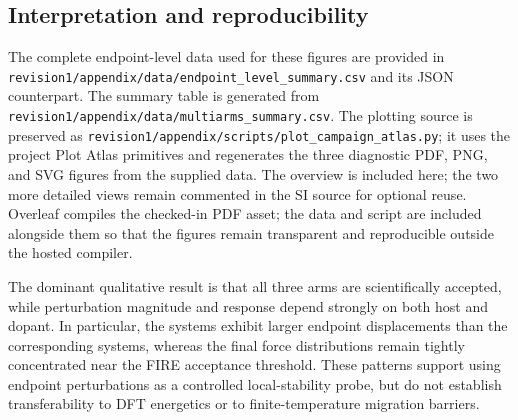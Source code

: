 %
%
\subsection{Interpretation and reproducibility}

The complete endpoint-level data used for these figures are provided in
\texttt{revision1/appendix/data/endpoint\_level\_summary.csv} and its JSON
counterpart.  The summary table is generated from
\texttt{revision1/appendix/data/multiarms\_summary.csv}.  The plotting source
is preserved as
\texttt{revision1/appendix/scripts/plot\_campaign\_atlas.py}; it uses the
project Plot Atlas primitives and regenerates the three diagnostic PDF, PNG,
and SVG figures from the supplied data.  The overview is included here; the
two more detailed views remain commented in the SI source for optional reuse.
Overleaf compiles the checked-in PDF asset;
the data and script are included alongside them so that the figures remain
transparent and reproducible outside the hosted compiler.

The dominant qualitative result is that all three arms are scientifically
accepted, while perturbation magnitude and response depend strongly on both
host and dopant.  In particular, the  systems exhibit larger
endpoint displacements than the corresponding  systems, whereas
the final force distributions remain tightly concentrated near the FIRE
acceptance threshold.  These patterns support using endpoint perturbations as
a controlled local-stability probe, but do not establish transferability to
DFT energetics or to finite-temperature migration barriers.
